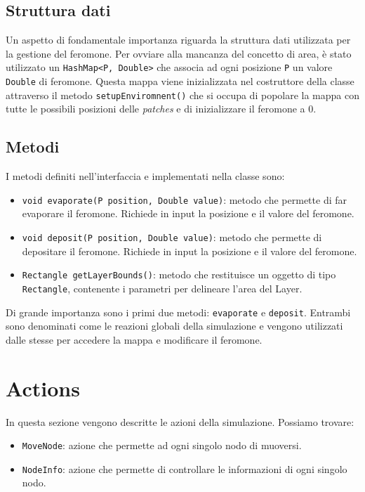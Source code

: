 \subsection{Struttura dati}\label{strDati}
Un aspetto di fondamentale importanza riguarda la struttura dati utilizzata per la gestione del feromone.
Per ovviare alla mancanza del concetto di area, è stato utilizzato un \texttt{HashMap<P, Double>} che associa ad ogni posizione \texttt{P} un valore \texttt{Double} di feromone.
Questa mappa viene inizializzata nel costruttore della classe attraverso il metodo \texttt{setupEnviromnent()} che si occupa di popolare la mappa
con tutte le possibili posizioni delle \textit{patches} e di inizializzare il feromone a 0.\newline



\subsection{Metodi}
I metodi definiti nell'interfaccia e implementati nella classe sono:
\begin{itemize}
    \item \texttt{void evaporate(P position, Double value)}: metodo che permette di far evaporare il feromone. 
    Richiede in input la posizione e il valore del feromone.
    \item \texttt{void deposit(P position, Double value)}: metodo che permette di depositare il feromone.
     Richiede in input la posizione e il valore del feromone.
    \item \texttt{Rectangle getLayerBounds()}: metodo che restituisce un oggetto di tipo \texttt{Rectangle}, contenente i parametri per delineare l'area del Layer.
\end{itemize}
Di grande importanza sono i primi due metodi: \texttt{evaporate} e \texttt{deposit}.
Entrambi sono denominati come le reazioni globali della simulazione e vengono utilizzati dalle stesse per accedere la mappa e modificare il feromone.\newline


\section{Actions}
In questa sezione vengono descritte le azioni della simulazione. Possiamo trovare:
\begin{itemize}
    \item \texttt{MoveNode}: azione che permette ad ogni singolo nodo di muoversi.
    \item \texttt{NodeInfo}: azione che permette di controllare le informazioni di ogni singolo nodo.
\end{itemize}

